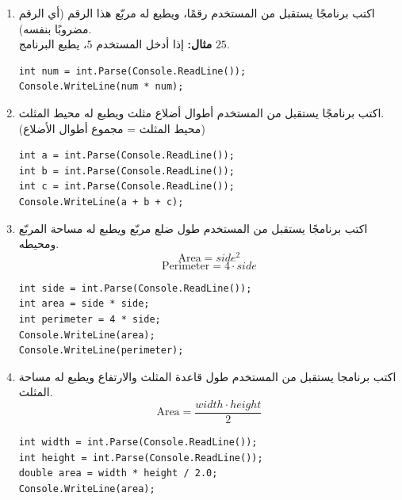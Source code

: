 \documentclass[14pt]{extarticle}
\begin{document}
\begin{enumerate}[itemsep=2em]
    \item
    اكتب برنامجًا يستقبل من المستخدم رقمًا، ويطبع له مربّع هذا الرقم (أي الرقم مضروبًا بنفسه). \\
    \textbf{مثال:} إذا أدخل المستخدم $5$، يطبع البرنامج $25$.
    \ifwithsols
    \begin{boxSolution}
    \begin{english}
    \begin{verbatim}
int num = int.Parse(Console.ReadLine());
Console.WriteLine(num * num);
    \end{verbatim}
    \end{english}
    \end{boxSolution}
    \fi

    \item
    اكتب برنامجًا يستقبل من المستخدم أطوال أضلاع مثلث ويطبع له محيط المثلث. \\
    (محيط المثلث = مجموع أطوال الأضلاع)
    \ifwithsols
    \begin{boxSolution}
    \begin{english}
    \begin{verbatim}
int a = int.Parse(Console.ReadLine());
int b = int.Parse(Console.ReadLine());
int c = int.Parse(Console.ReadLine());
Console.WriteLine(a + b + c);
    \end{verbatim}
    \end{english}
    \end{boxSolution}
    \fi

\item
اكتب برنامجًا يستقبل من المستخدم طول ضلع مربّع ويطبع له مساحة المربّع ومحيطه.
$$ \text{Area} = side ^ 2 $$
$$ \text{Perimeter} = 4 \cdot side $$
\ifwithsols
\begin{boxSolution}
\begin{english}
\begin{verbatim}
int side = int.Parse(Console.ReadLine());
int area = side * side;
int perimeter = 4 * side;
Console.WriteLine(area);
Console.WriteLine(perimeter);
\end{verbatim}
\end{english}
\end{boxSolution}
\clearpage
\fi

\item
اكتب برنامجا يستقبل من المستخدم طول قاعدة المثلث والارتفاع ويطبع له مساحة المثلث.
$$ \text{Area} = \frac{width \cdot height}{2} $$
\ifwithsols
\begin{boxSolution}
\begin{english}
\begin{verbatim}
int width = int.Parse(Console.ReadLine());
int height = int.Parse(Console.ReadLine());
double area = width * height / 2.0;
Console.WriteLine(area);
\end{verbatim}
\end{english}
\end{boxSolution}
\fi


\end{enumerate}
\end{document}
